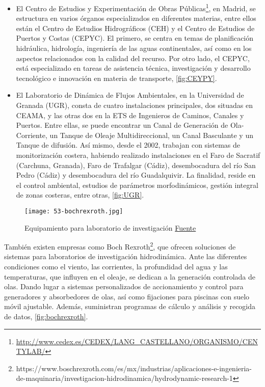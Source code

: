 \begin{itemize}
\item
  El Centro de Estudios y Experimentación de Obras Públicas\footnote{\url{http://www.cedex.es/CEDEX/LANG_CASTELLANO/ORGANISMO/CENTYLAB/}},
  en Madrid, se estructura en varios órganos especializados en
  diferentes materias, entre ellos están el Centro de Estudios
  Hidrográficos (CEH) y el Centro de Estudios de Puertos y Costas
  (CEPYC). El primero, se centra en temas de planificación hidráulica,
  hidrología, ingeniería de las aguas continentales, así como en los
  aspectos relacionados con la calidad del recurso. Por otro lado, el
  CEPYC, está especializado en tareas de asistencia técnica,
  investigación y desarrollo tecnológico e innovación en materia de
  transporte, \autoref{fig:CEYPY}.

\item
  El Laboratorio de Dinámica de Flujos Ambientales, en la Universidad de
  Granada (UGR), consta de cuatro instalaciones principales, dos
  situadas en CEAMA, y las otras dos en la ETS de Ingenieros de Caminos,
  Canales y Puertos. Entre ellas, se puede encontrar un Canal de
  Generación de Ola-Corriente, un Tanque de Oleaje Multidireccional, un
  Canal Basculante y un Tanque de difusión. Así mismo, desde el 2002,
  trabajan con sistemas de monitorización costera, habiendo realizado
  instalaciones en el Faro de Sacratif (Carchuna, Granada), Faro de
  Trafalgar (Cádiz), desembocadura del río San Pedro (Cádiz) y
  desembocadura del río Guadalquivir. La finalidad, reside en el control
  ambiental, estudios de parámetros morfodinámicos, gestión integral de
  zonas costeras, entre otras, \autoref{fig:UGR}.
\end{itemize}

\begin{figure}[hb]
  \centering
  \texttt{[image: 53-bochrexroth.jpg]}
  \caption[Equipamiento para laboratorio de investigación]{Equipamiento para laboratorio de investigación \href{https://www.boschrexroth.com/es/mx/industrias/aplicaciones-e-ingenieria-de-maquinaria/investigacion-hidrodinamica/hydrodynamic-research-1}{Fuente}}
  \label{fig:bochrexroth}
  \end{figure}

También existen empresas como Boch
Rexroth\footnote{https://www.boschrexroth.com/es/mx/industrias/aplicaciones-e-ingenieria-de-maquinaria/investigacion-hidrodinamica/hydrodynamic-research-1}, que ofrecen soluciones de sistemas para laboratorios de
investigación hidrodinámica. Ante las diferentes condiciones como el
viento, las corrientes, la profundidad del agua y las temperaturas, que
influyen en el oleaje, se dedican a la generación controlada de olas.
Dando lugar a sistemas personalizados de accionamiento y control para
generadores y absorbedores de olas, así como fijaciones para piscinas
con suelo móvil ajustable. Además, suministran programas de cálculo y
análisis y recogida de datos, \autoref{fig:bochrexroth}.

